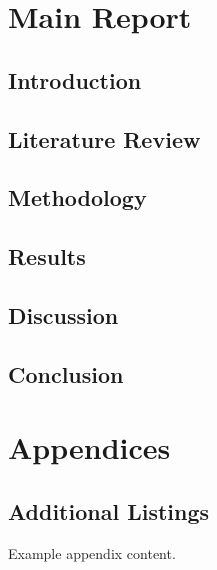 \documentclass[11pt,english,a4paper,hidelinks]{book}
\begin{document}
\listoffigures
\newpage

\listoftables
\newpage



\clearpage
{}
\setcounter{page}{1}

\part{Main Report}

\chapter{Introduction}

\chapter{Literature Review}

\chapter{Methodology}

\chapter{Results}

\chapter{Discussion}

\chapter{Conclusion}

\printbibliography[heading=bibintoc, title=Bibliography]
\label{sec:biblio}
\newpage

\part{Appendices}
\def\thechapter{\Alph{chapter}}
\makeatletter
\renewcommand{\@chapapp}{Appendix}
\makeatother

\chapter{Additional Listings}
Example appendix content.
\end{document}
